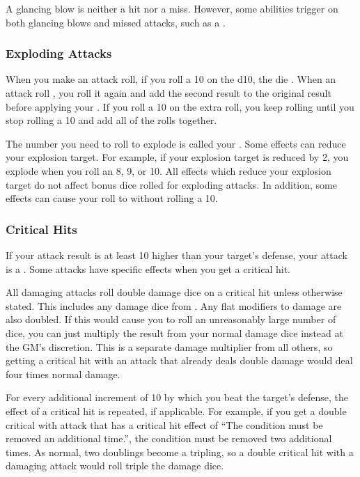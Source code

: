             A glancing blow is neither a hit nor a miss.
            However, some abilities trigger on both glancing blows and missed attacks, such as a .

        \subsubsection{Exploding Attacks}\label{Exploding Attacks}
            When you make an attack roll, if you roll a 10 on the d10, the die .
            When an attack roll , you roll it again and add the second result to the original result before applying your .
            If you roll a 10 on the extra roll, you keep rolling until you stop rolling a 10 and add all of the rolls together.

            The number you need to roll to explode is called your .
            Some effects can reduce your explosion target.
            For example, if your explosion target is reduced by 2, you explode when you roll an 8, 9, or 10.
            All effects which reduce your explosion target do not affect bonus dice rolled for exploding attacks.
            In addition, some effects can cause your roll to  without rolling a 10.

        \subsubsection{Critical Hits}\label{Critical Hits}
            If your attack result is at least 10 higher than your target's defense, your attack is a .
            Some attacks have specific effects when you get a critical hit.

            All damaging attacks roll double damage dice on a critical hit unless otherwise stated.
            This includes any damage dice from .
            Any flat modifiers to damage are also doubled.
            If this would cause you to roll an unreasonably large number of dice, you can just multiply the result from your normal damage dice instead at the GM's discretion.
            This is a separate damage multiplier from all others, so getting a critical hit with an attack that already deals double damage would deal four times normal damage.

            For every additional increment of 10 by which you beat the target's defense, the effect of a critical hit is repeated, if applicable.
            For example, if you get a double critical with attack that has a critical hit effect of ``The condition must be removed an additional time.'', the condition must be removed two additional times.
            As normal, two doublings become a tripling, so a double critical hit with a damaging attack would roll triple the damage dice.

